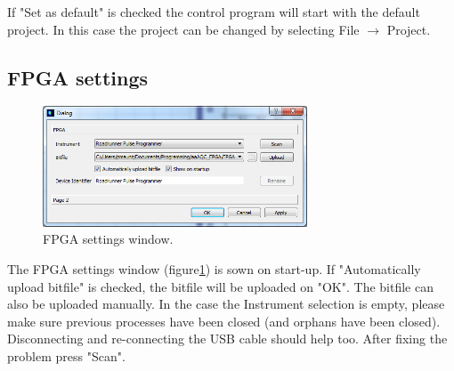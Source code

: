 \documentclass[11pt]{scrartcl}
\begin{document}
If "Set as default" is checked the control program will start with the default project. In this case the project can be changed by selecting File $\rightarrow$ Project.

\subsection{FPGA settings}
\begin{figure}[htbp]
\begin{center}
\includegraphics[width=0.7\textwidth]{FPGASettings}
\end{center}
\caption{\label{FPGASettings} FPGA settings window.}
\end{figure}
The FPGA settings window (figure\ref{FPGASettings}) is sown on start-up. If "Automatically upload bitfile" is checked, the bitfile will be uploaded on "OK". The bitfile can also be uploaded manually. In the case the Instrument selection is empty, please make sure previous processes have been closed (and orphans have been closed). Disconnecting and re-connecting the USB cable should help too. After fixing the problem press "Scan".
\end{document}
